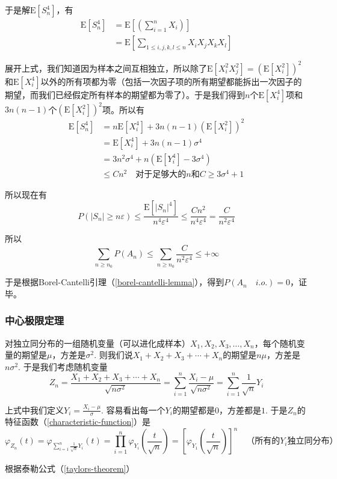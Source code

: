\documentclass[UTF8]{ctexbook}
\begin{document}
于是解$\mathrm E[S_n^4]$，有
\begin{align*}
	\mathrm E[S_n^4]&=\mathrm E\left[\left(\sum_{i=1}^nX_i\right)\right] \\
	&=\mathrm E\left[\sum_{1\leq i,j,k,l\leq n}X_iX_jX_kX_l\right]
\end{align*}

展开上式，我们知道因为样本之间互相独立，所以除了$\mathrm E[X_i^2X_j^2]=(\mathrm E[X_i^2])^2$和$\mathrm E[X_i^4]$以外的所有项都为零（包括一次因子项的所有期望都能拆出一次因子的期望，而我们已经假定所有样本的期望都为零了）。于是我们得到$n$个$\mathrm E[X_i^4]$项和$3n(n-1)$个$(\mathrm E[X_i^2])^2$项。所以有
\begin{align*}
	\mathrm E[S_n^4]&=n\mathrm E[X_i^4]+3n(n-1)(\mathrm E[X_i^2])^2\\
	&=\mathrm E[X_i^4]+3n(n-1)\sigma^4 \\
	&=3n^2\sigma^4+n(\mathrm E[Y_i^4]-3\sigma^4) \\
	&\leq Cn^2\quad\text{对于足够大的$n$和$C\geq3\sigma^4+1$}
\end{align*}

所以现在有
\[
	P\left(|S_n|\geq n\varepsilon\right)\leq\frac{\mathrm E[|S_n|^4]}{n^4\varepsilon^4}\leq\frac{Cn^2}{n^4\varepsilon^4}=\frac{C}{n^2\varepsilon^4}
\]

所以
\[
	\sum_{n\geq n_0}P(A_n)\leq\sum_{n\geq n_0}\frac{C}{n^2\varepsilon^4}\leq+\infty
\]

于是根据Borel-Cantelli引理（\ref{borel-cantelli-lemma}），得到$P(A_n\quad i.o.)=0$，证毕。
\subsubsection{中心极限定理}
\label{CLT-proof}
对独立同分布的一组随机变量（可以进化成样本）$X_1,X_2,X_3,\dots,X_n$，每个随机变量的期望是$\mu$，方差是$\sigma^2$. 则我们说$X_1+X_2+X_3+\cdots+X_n$的期望是$n\mu$，方差是$n\sigma^2$. 于是我们考虑随机变量
\[
	Z_n=\frac{X_1+X_2+X_3+\cdots+X_n}{\sqrt{n\sigma^2}}=\sum_{i=1}^n\frac{X_i-\mu}{\sqrt{n\sigma^2}}=\sum_{i=1}^n\frac{1}{\sqrt n}Y_i
\]

上式中我们定义$Y_i=\frac{X_i-\mu}{\sigma}$. 容易看出每一个$Y_i$的期望都是$0$，方差都是$1$. 于是$Z_n$的特征函数（\ref{characteristic-function}）是
\[
	\varphi_{Z_n}(t)=\varphi_{\sum_{i=1}^n\frac{1}{\sqrt n}Y_i}(t)=\prod_{i=1}^n\varphi_{Y_i}\left(\frac{t}{\sqrt n}\right)=\left[\varphi_{Y_1}\left(\frac{t}{\sqrt n}\right)\right]^n\quad\text{（所有的$Y_i$独立同分布）}
\]

根据泰勒公式（\ref{taylors-theorem}）
\end{document}
